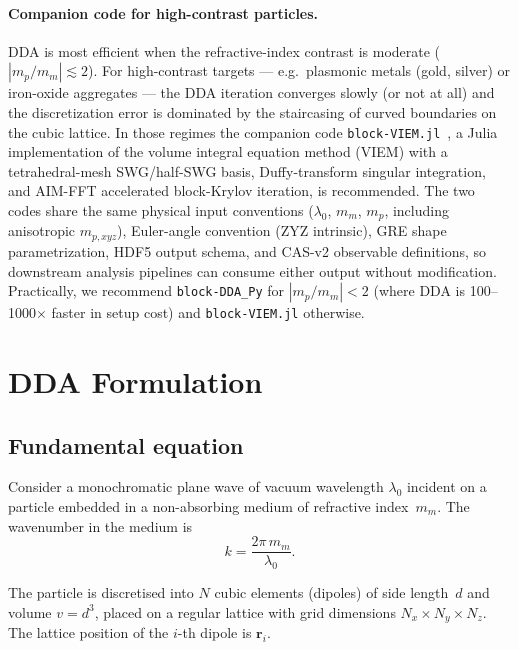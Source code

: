 \documentclass[11pt,a4paper]{article}
\begin{document}
\paragraph{Companion code for high-contrast particles.}
DDA is most efficient when the refractive-index contrast is moderate
($|m_p/m_m| \lesssim 2$). For high-contrast targets --- e.g.\ plasmonic
metals (gold, silver) or iron-oxide aggregates --- the DDA
iteration converges slowly (or not at all) and the discretization error
is dominated by the staircasing of curved boundaries on the cubic
lattice. In those regimes the companion code
\texttt{block-VIEM.jl}~\cite{blockVIEM}, a Julia implementation of the
volume integral equation method (VIEM) with a tetrahedral-mesh
SWG/half-SWG basis, Duffy-transform singular integration, and AIM-FFT
accelerated block-Krylov iteration, is recommended. The two codes
share the same physical input conventions ($\lambda_0$, $m_m$, $m_p$,
including anisotropic $m_{p,xyz}$), Euler-angle convention (ZYZ
intrinsic), GRE shape parametrization, HDF5 output schema, and CAS-v2
observable definitions, so downstream analysis pipelines can consume
either output without modification. Practically, we recommend
\texttt{block-DDA\_Py} for $|m_p/m_m| < 2$ (where DDA is
100--1000$\times$ faster in setup cost) and \texttt{block-VIEM.jl}
otherwise.

\section{DDA Formulation}
\label{sec:dda-formulation}

\subsection{Fundamental equation}
\label{sec:fundamental-eq}

Consider a monochromatic plane wave of vacuum wavelength $\lambda_0$ incident
on a particle embedded in a non-absorbing medium of refractive index~$m_m$.
The wavenumber in the medium is
\begin{equation}
  k = \frac{2\pi\, m_m}{\lambda_0}.
  \label{eq:wavenumber}
\end{equation}

The particle is discretised into $N$ cubic elements (dipoles) of side
length~$d$ and volume $v = d^3$, placed on a regular lattice with grid
dimensions $N_x \times N_y \times N_z$.
The lattice position of the $i$-th dipole is $\bm{r}_i$.
\end{document}
